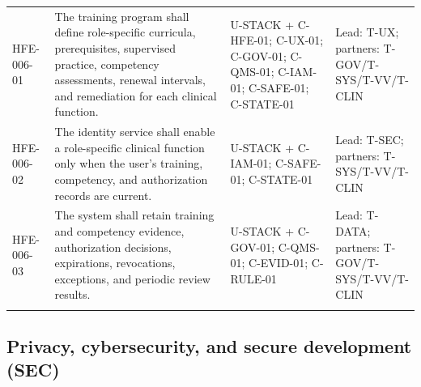 \documentclass[11pt,letterpaper]{article}
\begin{document}
\begin{scriptsize}
\begin{longtable}{@{}L{0.115\textwidth}L{0.345\textwidth}L{0.265\textwidth}L{0.195\textwidth}@{}}
\addlinespace[2pt]
\mbox{HFE-006-01} & The training program shall define role-specific curricula, prerequisites, supervised practice, competency assessments, renewal intervals, and remediation for each clinical function. & U-STACK + C-HFE-01; C-UX-01; C-GOV-01; C-QMS-01; C-IAM-01; C-SAFE-01; C-STATE-01 & Lead: T-UX; partners: T-GOV\slash\allowbreak{}T-SYS\slash\allowbreak{}T-VV\slash\allowbreak{}T-CLIN \\
\addlinespace[2pt]
\mbox{HFE-006-02} & The identity service shall enable a role-specific clinical function only when the user's training, competency, and authorization records are current. & U-STACK + C-IAM-01; C-SAFE-01; C-STATE-01 & Lead: T-SEC; partners: T-SYS\slash\allowbreak{}T-VV\slash\allowbreak{}T-CLIN \\
\addlinespace[2pt]
\mbox{HFE-006-03} & The system shall retain training and competency evidence, authorization decisions, expirations, revocations, exceptions, and periodic review results. & U-STACK + C-GOV-01; C-QMS-01; C-EVID-01; C-RULE-01 & Lead: T-DATA; partners: T-GOV\slash\allowbreak{}T-SYS\slash\allowbreak{}T-VV\slash\allowbreak{}T-CLIN \\
\addlinespace[2pt]
\end{longtable}
\end{scriptsize}

\subsection{Privacy, cybersecurity, and secure development (SEC)}
\end{document}
